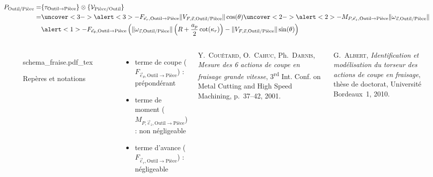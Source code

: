 \documentclass{style/presentation}
\begin{document}
\begin{frame}
    \vspace{-5mm}
    \begin{align*}
        P_{\text{Outil/Pièce}} = & \{\tau_{\text{Outil}\to\text{Pièce}}\} \otimes \{\mathcal{V}_{\text{Pièce/Outil}}\}                                                                                                             \\
                               = & \uncover<3->{\alert<3>{- F_{\vec{e}_r,\text{Outil}\to\text{Pièce}} \|V_{F,\vec{x},\text{Outil/Pièce}}\| \cos(\theta)}} \uncover<2->{\alert<2>{- M_{P,\vec{e}_z,\text{Outil}\to\text{Pièce}} \|\omega_{\vec{z},\text{Outil/Pièce}}\|}} \\
                               & \alert<1>{- F_{\vec{e}_\theta,\text{Outil}\to\text{Pièce}} \left(\|\omega_{\vec{z},\text{Outil/Pièce}}\|\left(R+\frac{a_p}{2}\cot(\kappa_r)\right)-\|V_{F,\vec{x},\text{Outil/Pièce}}\| \sin(\theta)\right)}
    \end{align*}

    \begin{columns}[T]
        \begin{figure}
            \centering
            \def\svgwidth{\textwidth}
            {schema_fraise.pdf_tex}
            \caption{Repères et notations}
        \end{figure}

        \begin{itemize}
            \item terme de \alert<1>{coupe} ($F_{\vec{e}_\theta,\text{Outil}\to\text{Pièce}}$) : prépondérant
            \item<2-> terme de \alert<2>{moment} ($M_{P,\vec{e}_z,\text{Outil}\to\text{Pièce}}$) : non négligeable
            \item<3-> terme d'\alert<3>{avance} ($F_{\vec{e}_r,\text{Outil}\to\text{Pièce}}$) : négligeable
        \end{itemize}
        \vspace{2cm}
        {\footnotesize\color{jvgris} Y.~\textsc{Couétard}, O.~\textsc{Cahuc}, Ph.~\textsc{Darnis}, \emph{Mesure des 6 actions de coupe en fraisage grande vitesse}, 3\textsuperscript{rd} Int. Conf. on Metal Cutting and High Speed Machining, p.~37--42, 2001.\par
        G.~\textsc{Albert}, \emph{Identification et modélisation du torseur des actions de coupe en fraisage}, thèse de doctorat, Université Bordeaux~1, 2010.\par}
    \end{columns}
\end{frame}
\end{document}
